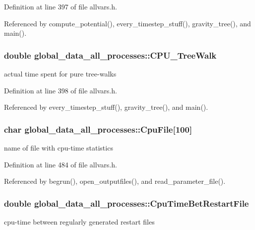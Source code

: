 Definition at line 397 of file allvars.h.



Referenced by compute\_\-potential(), every\_\-timestep\_\-stuff(), gravity\_\-tree(), and main().

\hypertarget{structglobal__data__all__processes_acf5e983357d7be116cd6663958e5a149}{
\subsubsection[{CPU\_\-TreeWalk}]{\setlength{\rightskip}{0pt plus 5cm}double {\bf global\_\-data\_\-all\_\-processes::CPU\_\-TreeWalk}}}
\label{structglobal__data__all__processes_acf5e983357d7be116cd6663958e5a149}
actual time spent for pure tree-\/walks 

Definition at line 398 of file allvars.h.



Referenced by every\_\-timestep\_\-stuff(), gravity\_\-tree(), and main().

\hypertarget{structglobal__data__all__processes_ac2ba980c60460b89534ca8bba63cd679}{
\subsubsection[{CpuFile}]{\setlength{\rightskip}{0pt plus 5cm}char {\bf global\_\-data\_\-all\_\-processes::CpuFile}\mbox{[}100\mbox{]}}}
\label{structglobal__data__all__processes_ac2ba980c60460b89534ca8bba63cd679}
name of file with cpu-\/time statistics 

Definition at line 484 of file allvars.h.



Referenced by begrun(), open\_\-outputfiles(), and read\_\-parameter\_\-file().

\hypertarget{structglobal__data__all__processes_af087b459cc41cb6b81bdbdd0e339cb6f}{
\subsubsection[{CpuTimeBetRestartFile}]{\setlength{\rightskip}{0pt plus 5cm}double {\bf global\_\-data\_\-all\_\-processes::CpuTimeBetRestartFile}}}
\label{structglobal__data__all__processes_af087b459cc41cb6b81bdbdd0e339cb6f}
cpu-\/time between regularly generated restart files 

